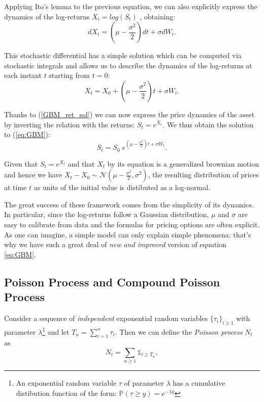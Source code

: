 Applying Ito's lemma to the previous equation, we can also explicitly express the dynamics of the log-returns $X_t = log(S_t)$ , obtaining:
\begin{equation}
	dX_t = (\mu - 	\frac{\sigma^2}{2}) dt + \sigma dW_t .
\end{equation}

This stochastic differential has a simple solution which can be computed via stochastic integrals and allows us to describe the dynamics of the log-returns at each instant $t$ starting from $t=0$:
\begin{equation}
	\label{GBM_ret_sol}
	X_t = X_0 + (\mu - 	\frac{\sigma^2}{2}) t + \sigma W_t.
\end{equation}

Thanks to (\ref{GBM_ret_sol}) we can now express the price dynamics of the asset by inverting the relation with the returns: $S_t = e^{X_t}$. 
We thus obtain the solution to (\ref{eq:GBM}):
\begin{equation}
	S_t = S_0 \;e^{(\mu - 	\frac{\sigma^2}{2}) t + \sigma W_t}.
\end{equation}

Given that $S_t = e^{X_t}$ and that $X_t$ by its equation is a generalized brownian motion and hence we have $X_t - X_0 \sim \mathcal{N}(\mu - 	\frac{\sigma^2}{2}, \sigma^2)$, the resulting distribution of prices at time $t$ as units of the initial value is distibuted as a log-normal.

The great success of these framework comes from the simplicity of its dynamics. In particular, since the log-returns follow a Gaussian distribution, $\mu$ and $\sigma$ are easy to calibrate from data and the formulas for pricing options  are often explicit.
As one can imagine, a simple model can only explain simple phenomena: that's why we have such a great deal of \textit{new and improved} version of equation \eqref{eq:GBM}.

\subsection{Poisson Process and Compound Poisson Process}
\label{sub:poisson}
Consider a sequence of \textit{independent} exponential random variables  $\{\tau_i\}_{i\geq1}$ with parameter $\lambda$\footnote{An exponential random variable $\tau$ of parameter $\lambda$ has a cumulative distibution function of the form: $\mathbb{P}(\tau \geq y) = e^{-\lambda y}$} and let $T_n = \sum_{i=1}^{n}\tau_i$. Then we can define the \textit{Poisson process} $N_t$ as
\begin{equation}
 	N_t = \sum_{n\geq 1} \mathds{1}_{t \geq T_n},
\end{equation}

